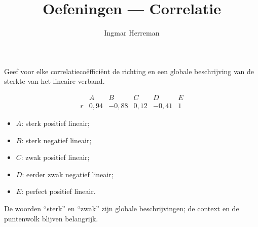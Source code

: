 \documentclass{ximera}
\title{Oefeningen --- Correlatie}
\author{Ingmar Herreman}
\begin{document}




















\maketitle



\begin{oefening}{\oefB \ESS}

Geef voor elke correlatiecoëfficiënt de richting en een globale
beschrijving van de sterkte van het lineaire verband.

\[
\begin{array}{c|ccccc}
& A&B&C&D&E\\ \hline
r&0{,}94&-0{,}88&0{,}12&-0{,}41&1
\end{array}
\]

\begin{oplossing}
\begin{itemize}
  \item $A$: sterk positief lineair;
  \item $B$: sterk negatief lineair;
  \item $C$: zwak positief lineair;
  \item $D$: eerder zwak negatief lineair;
  \item $E$: perfect positief lineair.
\end{itemize}
De woorden ``sterk'' en ``zwak'' zijn globale beschrijvingen; de
context en de puntenwolk blijven belangrijk.
\end{oplossing}
\end{oefening}
\end{document}
